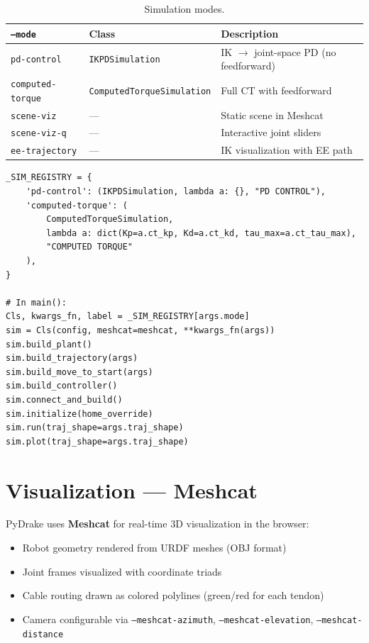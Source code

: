 \documentclass[11pt,a4paper]{article}
\begin{document}
\begin{table}[h]
\centering
\caption{Simulation modes.}
\begin{tabular}{lll}
\toprule
\textbf{\texttt{--mode}} & \textbf{Class} & \textbf{Description} \\
\midrule
\texttt{pd-control}       & \texttt{IKPDSimulation}         & IK $\to$ joint-space PD (no feedforward) \\
\texttt{computed-torque}   & \texttt{ComputedTorqueSimulation} & Full CT with feedforward \\
\texttt{scene-viz}         & --- & Static scene in Meshcat \\
\texttt{scene-viz-q}       & --- & Interactive joint sliders \\
\texttt{ee-trajectory}     & --- & IK visualization with EE path \\
\bottomrule
\end{tabular}
\end{table}

\begin{lstlisting}[caption={Mode registry dispatch.}]
_SIM_REGISTRY = {
    'pd-control': (IKPDSimulation, lambda a: {}, "PD CONTROL"),
    'computed-torque': (
        ComputedTorqueSimulation,
        lambda a: dict(Kp=a.ct_kp, Kd=a.ct_kd, tau_max=a.ct_tau_max),
        "COMPUTED TORQUE"
    ),
}

# In main():
Cls, kwargs_fn, label = _SIM_REGISTRY[args.mode]
sim = Cls(config, meshcat=meshcat, **kwargs_fn(args))
sim.build_plant()
sim.build_trajectory(args)
sim.build_move_to_start(args)
sim.build_controller()
sim.connect_and_build()
sim.initialize(home_override)
sim.run(traj_shape=args.traj_shape)
sim.plot(traj_shape=args.traj_shape)
\end{lstlisting}


\section{Visualization --- Meshcat}
\label{sec:meshcat}

PyDrake uses \textbf{Meshcat} for real-time 3D visualization in the browser:

\begin{itemize}[leftmargin=2em]
    \item Robot geometry rendered from URDF meshes (OBJ format)
    \item Joint frames visualized with coordinate triads
    \item Cable routing drawn as colored polylines (green/red for each tendon)
    \item Camera configurable via \texttt{--meshcat-azimuth}, \texttt{--meshcat-elevation}, \texttt{--meshcat-distance}
\end{itemize}
\end{document}
